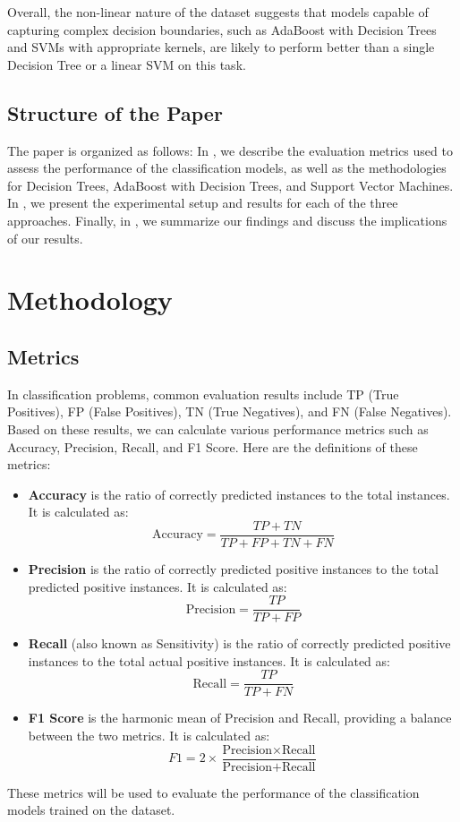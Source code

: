 \documentclass{article}
\begin{document}
Overall, the non-linear nature of the dataset suggests that models capable of capturing complex decision boundaries, such as AdaBoost with Decision Trees and SVMs with appropriate kernels, are likely to perform better than a single Decision Tree or a linear SVM on this task.


\subsection{Structure of the Paper}
The paper is organized as follows: In , we describe the evaluation metrics used to assess the performance of the classification models, as well as the methodologies for Decision Trees, AdaBoost with Decision Trees, and Support Vector Machines.
In , we present the experimental setup and results for each of the three approaches.
Finally, in , we summarize our findings and discuss the implications of our results.

\section{Methodology}
\label{sec:methodology}

\subsection{Metrics}
\label{sec:metrics}
In classification problems, common evaluation results include TP (True Positives), FP (False Positives), TN (True Negatives), and FN (False Negatives). 
Based on these results, we can calculate various performance metrics such as Accuracy, Precision, Recall, and F1 Score.
Here are the definitions of these metrics:
\begin{itemize}
        \item \textbf{Accuracy} is the ratio of correctly predicted instances to the total instances. It is calculated as:
        \[
        \text{Accuracy} = \frac{TP + TN}{TP + FP + TN + FN}
        \]
        
        \item \textbf{Precision} is the ratio of correctly predicted positive instances to the total predicted positive instances. It is calculated as:
        \[
        \text{Precision} = \frac{TP}{TP + FP}
        \]
        
        \item \textbf{Recall} (also known as Sensitivity) is the ratio of correctly predicted positive instances to the total actual positive instances. It is calculated as:
        \[
        \text{Recall} = \frac{TP}{TP + FN}
        \]
        
        \item \textbf{F1 Score} is the harmonic mean of Precision and Recall, providing a balance between the two metrics. It is calculated as:
        \[
        F1 = 2 \times \frac{\text{Precision} \times \text{Recall}}{\text{Precision} + \text{Recall}}
        \]
\end{itemize}
These metrics will be used to evaluate the performance of the classification models trained on the dataset.
\end{document}
